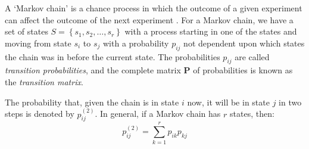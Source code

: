A `Markov chain' is a chance process in which the outcome of a given experiment
can affect the outcome of the next experiment \cite{Grinstead:1997}. For a
Markov chain, we have a set of states $S = \left\{s_1,s_2,\ldots,s_r\right\}$
with a process starting in one of the states and moving from state $s_i$ to
$s_j$ with a probability $p_{ij}$ not dependent upon which states the chain was
in before the current state. The probabilities $p_{ij}$ are called
\emph{transition probabilities}, and the complete matrix $\mathbf{P}$ of
probabilities is known as the \emph{transition matrix}.

The probability that, given the chain is in state $i$ now, it will be in state
$j$ in two steps is denoted by $p_{ij}^{(2)}$. In general, if a Markov chain has
$r$ states, then:
\begin{equation}
    p_{ij}^{(2)} = \sum_{k=1}^r p_{ik} p_{kj}
\end{equation}